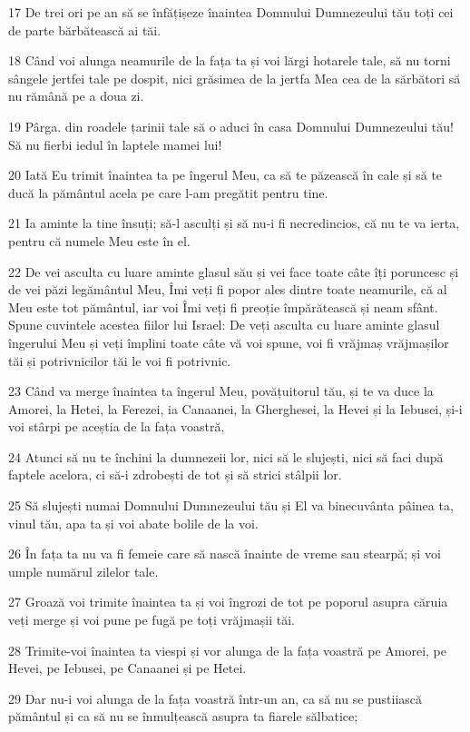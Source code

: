\par 17 De trei ori pe an să se înfățișeze înaintea Domnului Dumnezeului tău toți cei de parte bărbătească ai tăi.
\par 18 Când voi alunga neamurile de la fața ta și voi lărgi hotarele tale, să nu torni sângele jertfei tale pe dospit, nici grăsimea de la jertfa Mea cea de la sărbători să nu rămână pe a doua zi.
\par 19 Pârga. din roadele țarinii tale să o aduci în casa Domnului Dumnezeului tău! Să nu fierbi iedul în laptele mamei lui!
\par 20 Iată Eu trimit înaintea ta pe îngerul Meu, ca să te păzească în cale și să te ducă la pământul acela pe care l-am pregătit pentru tine.
\par 21 Ia aminte la tine însuți; să-l asculți și să nu-i fi necredincios, că nu te va ierta, pentru că numele Meu este în el.
\par 22 De vei asculta cu luare aminte glasul său și vei face toate câte îți poruncesc și de vei păzi legământul Meu, Îmi veți fi popor ales dintre toate neamurile, că al Meu este tot pământul, iar voi Îmi veți fi preoție împărătească și neam sfânt. Spune cuvintele acestea fiilor lui Israel: De veți asculta cu luare aminte glasul îngerului Meu și veți împlini toate câte vă voi spune, voi fi vrăjmaș vrăjmașilor tăi și potrivnicilor tăi le voi fi potrivnic.
\par 23 Când va merge înaintea ta îngerul Meu, povățuitorul tău, și te va duce la Amorei, la Hetei, la Ferezei, ia Canaanei, la Gherghesei, la Hevei și la Iebusei, și-i voi stârpi pe aceștia de la fața voastră,
\par 24 Atunci să nu te închini la dumnezeii lor, nici să le slujești, nici să faci după faptele acelora, ci să-i zdrobești de tot și să strici stâlpii lor.
\par 25 Să slujești numai Domnului Dumnezeului tău și El va binecuvânta pâinea ta, vinul tău, apa ta și voi abate bolile de la voi.
\par 26 În fața ta nu va fi femeie care să nască înainte de vreme sau stearpă; și voi umple numărul zilelor tale.
\par 27 Groază voi trimite înaintea ta și voi îngrozi de tot pe poporul asupra căruia veți merge și voi pune pe fugă pe toți vrăjmașii tăi.
\par 28 Trimite-voi înaintea ta viespi și vor alunga de la fața voastră pe Amorei, pe Hevei, pe Iebusei, pe Canaanei și pe Hetei.
\par 29 Dar nu-i voi alunga de la fața voastră într-un an, ca să nu se pustiiască pământul și ca să nu se înmulțească asupra ta fiarele sălbatice;
